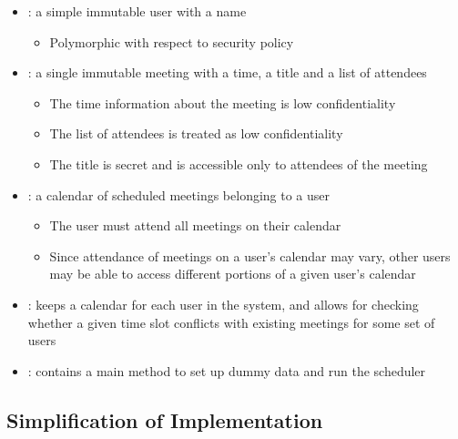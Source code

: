 \begin{itemize}
	
	\item {}: a simple immutable user with a name
	
	\begin{itemize}
		\item Polymorphic with respect to security policy
	\end{itemize}

	\item {}: a single immutable meeting with a time, a title and a list of attendees
	
	\begin{itemize}
		\item The time information about the meeting is low confidentiality
		
		\item The list of attendees is treated as low confidentiality
		
		\item The title is secret and is accessible only to attendees of the meeting
	\end{itemize}

	\item {}: a calendar of scheduled meetings belonging to a user

	\begin{itemize}
		\item The user must attend all meetings on their calendar
		
		\item Since attendance of meetings on a user's calendar may vary, other users may be able to access different portions of a given user's calendar
	\end{itemize}
	
	\item {}: keeps a calendar for each user in the system, and allows for checking whether a given time slot conflicts with existing meetings for some set of users
	
	\item {}: contains a main method to set up dummy data and run the scheduler
	
	
\end{itemize}

\subsection{Simplification of Implementation} \label{cs_csched_simplification}

